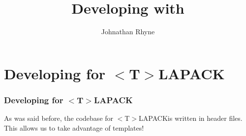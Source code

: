 \documentclass[12pt]{beamer}
\author{Johnathan Rhyne}
\title{Developing with \tla}
\newcommand{\tla}{$<$T$>$LAPACK}
\begin{document}
    \begin{frame}
        \maketitle
    \end{frame}
    \begin{frame}
        \tableofcontents
    \end{frame}
    \section{Developing for \tla}
    \begin{frame}
        \frametitle{Developing for \tla}
        As was said before, the codebase for \tla is written in header files. This allows us to 
        take advantage of templates!
    \end{frame}
\end{document}
